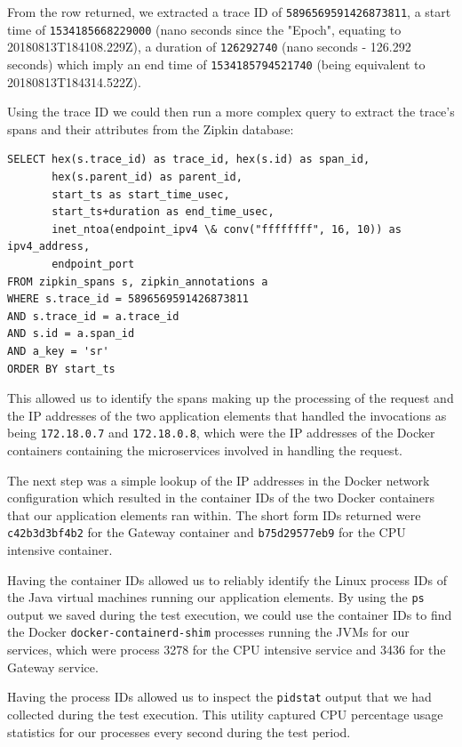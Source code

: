 From the row returned, we extracted a trace ID of \texttt{5896569591426873811}, a start time of \texttt{1534185668229000} (nano seconds since the "Epoch", equating to 20180813T184108.229Z), a duration of \texttt{126292740} (nano seconds - 126.292 seconds)	which imply an end time of \texttt{1534185794521740} (being equivalent to 20180813T184314.522Z).

Using the trace ID we could then run a more complex query to extract the trace's spans and their attributes from the Zipkin database:

\lstset{language=SQL}
\begin{lstlisting}
SELECT hex(s.trace_id) as trace_id, hex(s.id) as span_id,
       hex(s.parent_id) as parent_id,
       start_ts as start_time_usec, 
       start_ts+duration as end_time_usec,
       inet_ntoa(endpoint_ipv4 \& conv("ffffffff", 16, 10)) as ipv4_address,
       endpoint_port
FROM zipkin_spans s, zipkin_annotations a
WHERE s.trace_id = 5896569591426873811
AND s.trace_id = a.trace_id
AND s.id = a.span_id
AND a_key = 'sr'
ORDER BY start_ts
\end{lstlisting}

This allowed us to identify the spans making up the processing of the request and the IP addresses of the two application elements that handled the invocations as being \texttt{172.18.0.7} and \texttt{172.18.0.8}, which were the IP addresses of the Docker containers containing the microservices involved in handling the request.

The next step was a simple lookup of the IP addresses in the Docker network configuration which resulted in the container IDs of the two Docker containers that our application elements ran within.  The short form IDs returned were \texttt{c42b3d3bf4b2} for the Gateway container and \texttt{b75d29577eb9} for the CPU intensive container.

Having the container IDs allowed us to reliably identify the Linux process IDs of the Java virtual machines running our application elements.  By using the \texttt{ps} output we saved during the test execution, we could use the container IDs to find the Docker \texttt{docker-containerd-shim}  processes running the JVMs for our services, which were process 3278 for the CPU intensive service and 3436 for the Gateway service.

Having the process IDs allowed us to inspect the \texttt{pidstat} output that we had collected during the test execution.   This utility captured CPU percentage usage statistics for our processes every second during the test period.

